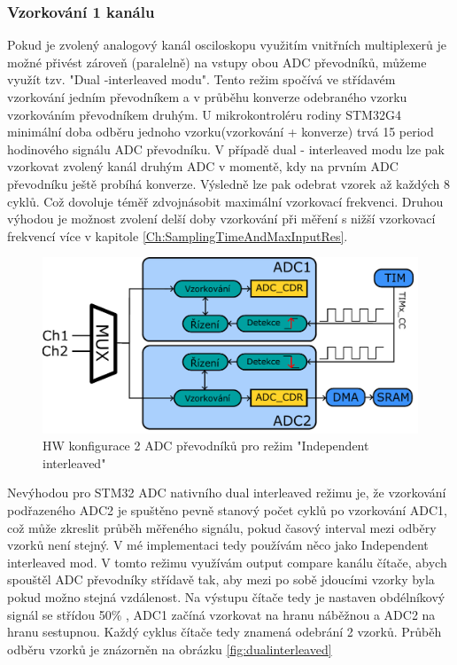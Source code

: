 \subsubsection{Vzorkování 1 kanálu}
Pokud je zvolený analogový kanál osciloskopu  využitím vnitřních multiplexerů je možné přivést zároveň (paralelně) na vstupy obou ADC převodníků, můžeme využít tzv. "Dual -interleaved modu". Tento režim spočívá ve střídavém vzorkování jedním převodníkem a v průběhu konverze odebraného vzorku vzorkováním převodníkem druhým. U mikrokontroléru rodiny STM32G4 minimální doba odběru jednoho vzorku(vzorkování + konverze) trvá 15 period hodinového signálu ADC převodníku. V případě dual - interleaved modu lze pak vzorkovat zvolený kanál druhým ADC v momentě, kdy na prvním ADC převodníku ještě probíhá konverze. Výsledně lze pak odebrat vzorek až každých 8 cyklů. Což dovoluje téměř zdvojnásobit maximální vzorkovací frekvenci. Druhou výhodou  je možnost zvolení delší doby vzorkování při měření s nižší vzorkovací frekvencí více v kapitole \ref{Ch:SamplingTimeAndMaxInputRes}. \\

\begin{figure}[H]
	\centering
	\includegraphics[width=0.8\linewidth]{Figs/Diagrams/SVG/ADC_Independent.pdf}
	\caption{HW konfigurace 2 ADC převodníků pro režim "Independent interleaved"}
	\label{fig:InterleavedHW}
\end{figure}

Nevýhodou pro STM32 ADC nativního dual interleaved režimu  je, že vzorkování podřazeného ADC2 je spuštěno pevně stanový počet cyklů po vzorkování ADC1, což může zkreslit průběh měřeného signálu, pokud časový interval mezi odběry vzorků není stejný. V mé implementaci tedy používám něco jako Independent interleaved mod. V tomto režimu využívám output compare kanálu čítače,  abych spouštěl ADC převodníky střídavě tak, aby mezi po sobě jdoucími vzorky byla pokud možno stejná vzdálenost. Na výstupu čítače tedy je nastaven obdélníkový signál se střídou 50\% , ADC1 začíná vzorkovat na hranu náběžnou a ADC2 na hranu sestupnou. Každý cyklus čítače tedy  znamená odebrání 2 vzorků. Průběh odběru vzorků je znázorněn na obrázku \ref{fig:dualinterleaved}\\


